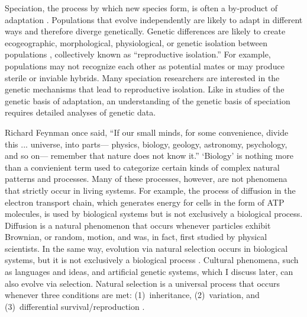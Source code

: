 \begin{doublespace}
Speciation, the process by which new species form,
is often a by-product of adaptation \citep{coy04,sch09,sob10}.
%
Populations that evolve independently are likely to adapt in different ways
and therefore diverge genetically.
%
Genetic differences are likely to create ecogeographic, morphological,
physiological, or genetic isolation between populations \citep{coy04,sch10},
collectively known as ``reproductive isolation.''
%
For example, populations may not recognize each other as potential mates
or may produce sterile or inviable hybrids.
%
Many speciation researchers are interested
in the genetic mechanisms that lead to reproductive isolation.
%
Like in studies of the genetic basis of adaptation,
an understanding of the genetic basis of speciation
requires detailed analyses of genetic data.


%

%

Richard Feynman once said, ``If our small minds, for some convenience,
divide this ... universe, into parts---%
physics, biology, geology, astronomy, psychology, and so on---%
remember that nature does not know it.''
%
`Biology' is nothing more than a convienient term used to categorize
certain kinds of complex natural patterns and processes.
%
Many of these processes, however, are not phenomena
that strictly occur in living systems.
%
For example, the process of diffusion in the electron transport chain,
which generates energy for cells in the form of ATP molecules,
is used by biological systems but is not exclusively a biological process.
%
Diffusion is a natural phenomenon that occurs whenever
particles exhibit Brownian, or random, motion,
and was, in fact, first studied by physical scientists.
%
In the same way, evolution via natural selection occurs in biological systems,
but it is not exclusively a biological process \citep{pen07}.
%
Cultural phenomena, such as languages and ideas,
and artificial genetic systems, which I discuss later,
can also evolve via selection.
%
Natural selection is a universal process that occurs whenever
three conditions are met: (1)~inheritance, (2)~variation,
and (3)~differential survival/reproduction \citep{ada06}.




\end{doublespace}
